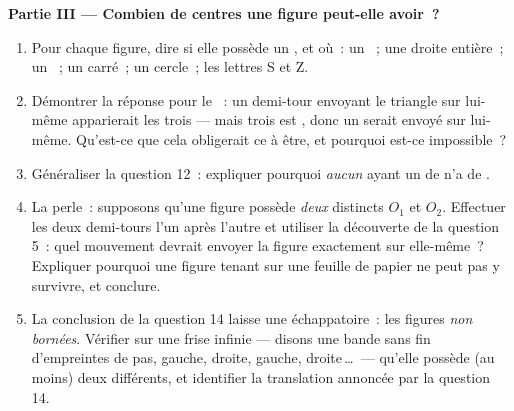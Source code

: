 \begin{problem}
\medskip
\noindent\textbf{Partie III --- Combien de centres une figure
peut-elle avoir~?}
\begin{enumerate}[resume]
  \item Pour chaque figure, dire si elle possède un , et où~: un ~; une droite entière~; un
        ~; un carré~; un cercle~; les lettres S
        et Z.
  \item Démontrer la réponse pour le ~: un
        demi-tour envoyant le triangle sur lui-même apparierait les
        trois  --- mais trois est , donc un 
        serait envoyé sur lui-même. Qu'est-ce que cela obligerait ce
         à être, et pourquoi est-ce impossible~?
  \item Généraliser la question 12~: expliquer pourquoi
        \emph{aucun}  ayant un  de  n'a
        de .
  \item La perle~: supposons qu'une figure possède \emph{deux}
         distincts $O_1$ et $O_2$. Effectuer les
        deux demi-tours l'un après l'autre et utiliser la découverte
        de la question 5~: quel mouvement devrait envoyer la figure
        exactement sur elle-même~? Expliquer pourquoi une figure
        tenant sur une feuille de papier ne peut pas y survivre, et
        conclure.
  \item La conclusion de la question 14 laisse une échappatoire~:
        les figures \emph{non bornées}. Vérifier sur une frise
        infinie --- disons une bande sans fin d'empreintes de pas,
        gauche, droite, gauche, droite\,\dots\ --- qu'elle possède
        (au moins) deux  différents, et
        identifier la translation annoncée par la question 14.
\end{enumerate}
\end{problem}
